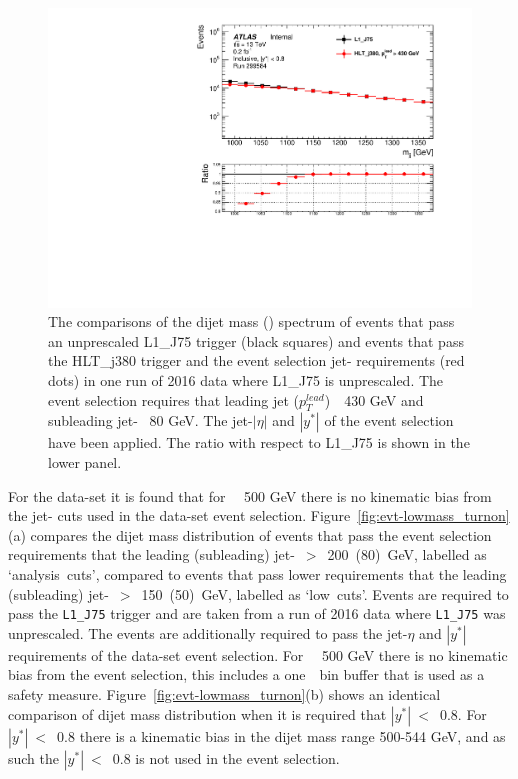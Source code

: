 \begin{figure}[!ht]
  \begin{center}
    \includegraphics[width=0.6\linewidth, angle=0]{figs/Dibjet/HighMass/evt-mjj.pdf}
  \end{center}
  \caption{The comparisons of the dijet mass (\mjj{}) spectrum of events that pass an unprescaled L1\_J75 trigger (black squares)
    and events that pass the  HLT\_j380 trigger and the \hm{} event selection jet-\pT{} requirements (red dots)
    in one run of 2016 data where L1\_J75 is unprescaled.
    The \hm{} event selection requires that leading jet \pT{} ($p_T^{lead}$)~\gt~430 GeV and subleading jet-\pT{} \gt~80 GeV.
    The jet-$|\eta|$ and $|y^*|$ of the \hm{} event selection have been applied.
    The ratio with respect to L1\_J75 is shown in the lower panel.}
     \label{fig:evt-hm_turnon}
\end{figure}

For the \lm{} data-set it is found that for \mjj~\gt~500 GeV there is no kinematic bias
from the jet-\pT{} cuts used in the \lm{} data-set event selection.
Figure~\ref{fig:evt-lowmass_turnon}(a) compares the dijet mass distribution of events
that pass the event selection requirements that the leading (subleading) jet-\pT{}~$>$~200~(80)~GeV, labelled as `analysis~cuts',
compared to events that pass lower requirements that the leading (subleading) jet-\pT{}~$>$~150~(50)~GeV, labelled as `low~cuts'.
Events are required to pass the \verb|L1_J75| trigger and are taken from a run of 2016 data where \verb|L1_J75| was unprescaled.
The events are additionally required to pass the jet-$\eta$ and $|y^*|$ requirements of the \lm{} data-set event selection.
For \mjj~\gt~500 GeV there is no kinematic bias from the \lm{} event selection,
this includes a one~\mjj~bin buffer that is used as a safety measure.
Figure~\ref{fig:evt-lowmass_turnon}(b) shows an identical comparison of  dijet mass distribution
when it is required that $|y^*|~<$~0.8.
For $|y^*|~<$~0.8 there is a kinematic bias in the dijet mass range 500-544 GeV,
and as such the $|y^*|~<$~0.8 is not used in the event selection.

